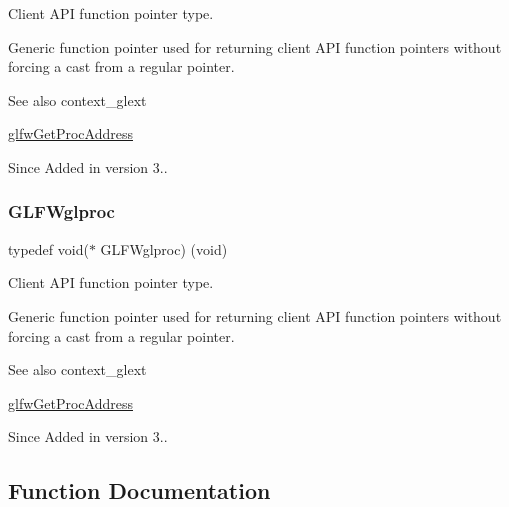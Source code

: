 Client A\+PI function pointer type. 

Generic function pointer used for returning client A\+PI function pointers without forcing a cast from a regular pointer.

\begin{DoxySeeAlso}{See also}
context\+\_\+glext 

\hyperlink{group__context_ga0e8af175218929615c16e74938c10f2a}{glfw\+Get\+Proc\+Address}
\end{DoxySeeAlso}
\begin{DoxySince}{Since}
Added in version 3.. 
\end{DoxySince}
\mbox{\label{group__context_ga3d47c2d2fbe0be9c505d0e04e91a133c}} 
\subsubsection{\texorpdfstring{G\+L\+F\+Wglproc}{GLFWglproc}\hspace{0.1cm}{\footnotesize\ttfamily [5/5]}}
{\footnotesize\ttfamily typedef void($\ast$ G\+L\+F\+Wglproc) (void)}



Client A\+PI function pointer type. 

Generic function pointer used for returning client A\+PI function pointers without forcing a cast from a regular pointer.

\begin{DoxySeeAlso}{See also}
context\+\_\+glext 

\hyperlink{group__context_ga0e8af175218929615c16e74938c10f2a}{glfw\+Get\+Proc\+Address}
\end{DoxySeeAlso}
\begin{DoxySince}{Since}
Added in version 3.. 
\end{DoxySince}


\subsection{Function Documentation}
\mbox{\label{group__context_ga9a28c712d35f9e43534e1d03b051c04c}} 
